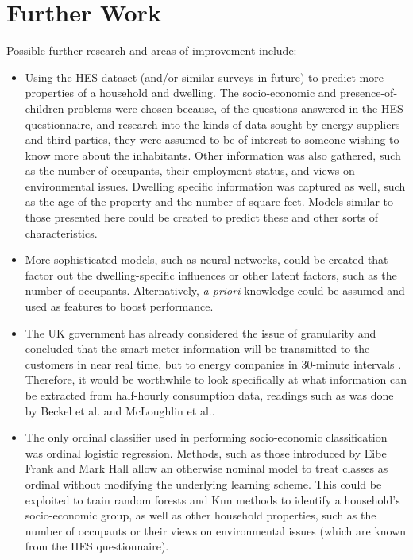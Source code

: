 \section{Further Work}
Possible further research and areas of improvement include:
\begin{itemize}

\item Using the HES dataset (and/or similar surveys in future) to predict more properties of a household and dwelling. The socio-economic and presence-of-children problems were chosen because, of the questions answered in the HES questionnaire, and research into the kinds of data sought by energy suppliers and third parties, they were assumed to be of interest to someone wishing to know more about the inhabitants. Other information was also gathered, such as the number of occupants, their employment status, and views on environmental issues. Dwelling specific information was captured as well, such as the age of the property and the number of square feet. Models similar to those presented here could be created to predict these and other sorts of characteristics.

\item More sophisticated models, such as neural networks, could be created that factor out the dwelling-specific influences or other latent factors, such as the number of occupants. Alternatively, \textit{a priori} knowledge could be assumed and used as features to boost performance.

\item The UK government has already considered the issue of granularity and concluded that the smart meter information will be transmitted to the customers in near real time, but to energy companies in 30-minute intervals \cite{DECC_1}.  Therefore, it would be worthwhile to look specifically at what information can be extracted from half-hourly consumption data, readings such as was done by Beckel et al. and McLoughlin et al.\cite{Beckel_2, McLoughlin}.

\item The only ordinal classifier used in performing socio-economic classification was ordinal logistic regression. Methods, such as those introduced by Eibe Frank and Mark Hall \cite{Frank} allow an otherwise nominal model to treat classes as ordinal without modifying the underlying learning scheme. This could be exploited to train random forests and Knn methods to identify a household's socio-economic group, as well as other household properties, such as the number of occupants or their views on environmental issues (which are known from the HES questionnaire).
\end{itemize}
